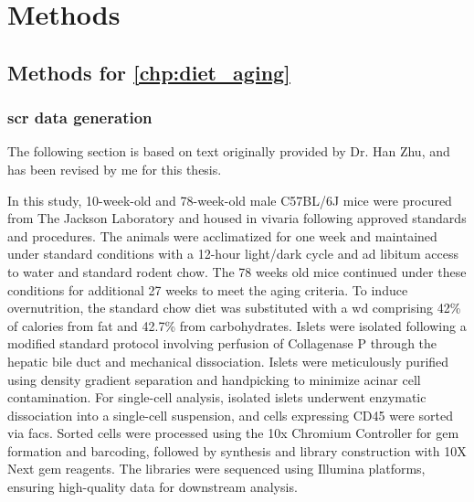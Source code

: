 
\chapter{Methods}
\label{chp:methods}

\newpage\null\thispagestyle{empty}\newpage



\section{Methods for \autoref{chp:diet_aging}}
\label{sec:chp2_methods}

\subsection[\glsentryshort{scr} data generation]{\large \gls{scr} data generation}
\label{subsec:met_chp2_scrdata}

\vspace{3mm}
\begin{Comment2}
\vspace{1mm}
\hspace{-3mm}
The following section is based on text originally provided by Dr. Han Zhu, and has been revised by me for this thesis.
\vspace{1mm}
\end{Comment2}
\vspace{3mm}

In this study, 10-week-old and 78-week-old male C57BL/6J mice were procured from The Jackson Laboratory and housed in vivaria following approved standards and procedures. The animals were acclimatized for one week and maintained under standard conditions with a 12-hour light/dark cycle and ad libitum access to water and standard rodent chow. The 78 weeks old mice continued under these conditions for additional 27 weeks to meet the aging criteria. To induce overnutrition, the standard chow diet was substituted with a \gls{wd} comprising 42\% of calories from fat and 42.7\% from carbohydrates. Islets were isolated following a modified standard protocol involving perfusion of Collagenase P through the hepatic bile duct and mechanical dissociation. Islets were meticulously purified using density gradient separation and handpicking to minimize acinar cell contamination. For single-cell analysis, isolated islets underwent enzymatic dissociation into a single-cell suspension, and cells expressing CD45 were sorted via \gls{facs}. Sorted cells were processed using the 10x Chromium Controller for \gls{gem} formation and barcoding, followed by  synthesis and library construction with 10X Next \gls{gem} reagents. The libraries were sequenced using Illumina platforms, ensuring high-quality data for downstream analysis. 

